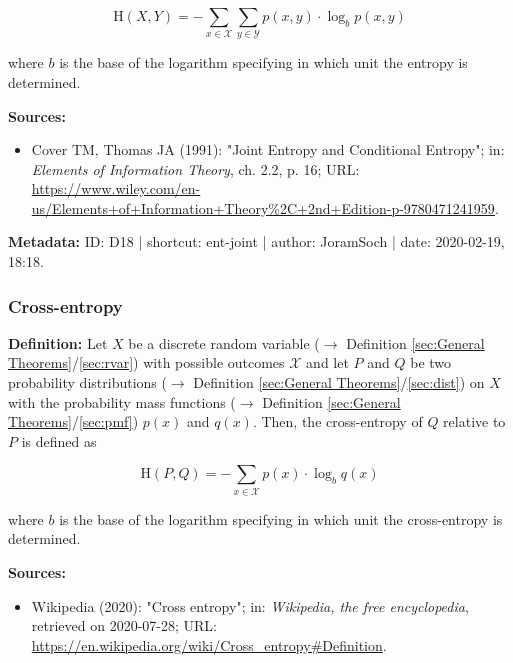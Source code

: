 \documentclass[a4paper,12pt,twoside]{book}
\begin{document}
\begin{equation} \label{eq:ent-joint-ent-joint}
\mathrm{H}(X,Y) = - \sum_{x \in \mathcal{X}} \sum_{y \in \mathcal{Y}} p(x,y) \cdot \log_b p(x,y)
\end{equation}

where $b$ is the base of the logarithm specifying in which unit the entropy is determined.


\vspace{1em}
\textbf{Sources:}
\begin{itemize}
\item Cover TM, Thomas JA (1991): "Joint Entropy and Conditional Entropy"; in: \textit{Elements of Information Theory}, ch. 2.2, p. 16; URL: \url{https://www.wiley.com/en-us/Elements+of+Information+Theory%2C+2nd+Edition-p-9780471241959}.
\end{itemize}


\vspace{1em}
\textbf{Metadata:} ID: D18 | shortcut: ent-joint | author: JoramSoch | date: 2020-02-19, 18:18.
\vspace{1em}



\subsubsection[\textit{Cross-entropy}]{Cross-entropy} \label{sec:ent-cross}
\setcounter{equation}{0}

\textbf{Definition:} Let $X$ be a discrete random variable ($\rightarrow$ Definition \ref{sec:General Theorems}/\ref{sec:rvar}) with possible outcomes $\mathcal{X}$ and let $P$ and $Q$ be two probability distributions ($\rightarrow$ Definition \ref{sec:General Theorems}/\ref{sec:dist}) on $X$ with the probability mass functions ($\rightarrow$ Definition \ref{sec:General Theorems}/\ref{sec:pmf}) $p(x)$ and $q(x)$. Then, the cross-entropy of $Q$ relative to $P$ is defined as

\begin{equation} \label{eq:ent-cross-ent-cross}
\mathrm{H}(P,Q) = - \sum_{x \in \mathcal{X}} p(x) \cdot \log_b q(x)
\end{equation}

where $b$ is the base of the logarithm specifying in which unit the cross-entropy is determined.


\vspace{1em}
\textbf{Sources:}
\begin{itemize}
\item Wikipedia (2020): "Cross entropy"; in: \textit{Wikipedia, the free encyclopedia}, retrieved on 2020-07-28; URL: \url{https://en.wikipedia.org/wiki/Cross_entropy#Definition}.
\end{itemize}
\end{document}
